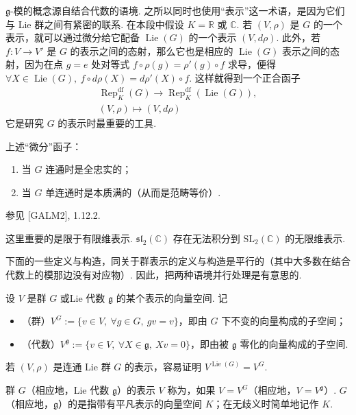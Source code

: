 \begin{numpara}\label{np:ssl-2-1-3}
$\mathfrak{g}$-模的概念源自结合代数的语境. 之所以同时也使用``表示''这一术语，是因为它们与 Lie 群之间有紧密的联系. 在本段中假设 $K = \mathbb{R}$ 或 $\mathbb{C}$.
若 $(V, \rho)$ 是 $G$ 的一个表示，就可以通过微分给它配备 $\operatorname{Lie}(G)$ 的一个表示 $(V, d\rho)$. 此外，若 $f : V \longrightarrow V'$ 是 $G$ 的表示之间的态射，那么它也是相应的 $\operatorname{Lie}(G)$ 表示之间的态射，因为在点 $g = e$ 处对等式 $f \circ \rho(g) = \rho'(g) \circ f$ 求导，便得 $\forall X \in \operatorname{Lie}(G),\ f \circ d\rho(X) = d\rho'(X) \circ f$. 这样就得到一个正合函子
\[\begin{gathered}
\operatorname{Rep}^{\mathrm{df}}_K(G) \longrightarrow \operatorname{Rep}^{\mathrm{df}}_K(\operatorname{Lie}(G)),\\
(V, \rho) \longmapsto (V, d\rho)
\end{gathered}\]
它是研究 $G$ 的表示时最重要的工具.
\begin{proposition*}
上述``微分''函子：
\begin{enumerate}[label=\roman*)]
\item 当 $G$ 连通时是全忠实的；
\item 当 $G$ 单连通时是本质满的（从而是范畴等价）.
\end{enumerate}
\end{proposition*}
参见 [GALM2], 1.12.2.
\begin{remark*}
这里重要的是限于有限维表示. $\mathfrak{sl}_2(\mathbb{C})$ 存在无法积分到 $\mathrm{SL}_2(\mathbb{C})$ 的无限维表示.
\end{remark*}
下面的一些定义与构造，同关于群表示的定义与构造是平行的（其中大多数在结合代数上的模那边没有对应物）. 因此，把两种语境并行处理是有意思的.
\end{numpara}

\begin{numpara}\label{np:ssl-2-1-4}
设 $V$ 是群 $G$ 或Lie 代数 $\mathfrak{g}$ 的某个表示的向量空间. 记
\begin{itemize}[label=\textendash]
\item （群）$V^{G} := \{v \in V,\ \forall g \in G,\ gv = v\}$，即由 $G$ 下不变的向量构成的子空间；
\item （代数）$V^{\mathfrak{g}} := \{v \in V,\ \forall X \in \mathfrak{g},\ Xv = 0\}$，即由被 $\mathfrak{g}$ 零化的向量构成的子空间.
\end{itemize}
\begin{remark*}
若 $(V, \rho)$ 是连通 Lie 群 $G$ 的表示，容易证明 $V^{\operatorname{Lie}(G)} = V^{G}$.
\end{remark*}
群 $G$（相应地，Lie 代数 $\mathfrak{g}$）的表示 $V$ 称为，如果 $V = V^{G}$（相应地，$V = V^{\mathfrak{g}}$）. $G$（相应地，$\mathfrak{g}$）的是指带有平凡表示的向量空间 $K$；在无歧义时简单地记作 $K$.
\end{numpara}

